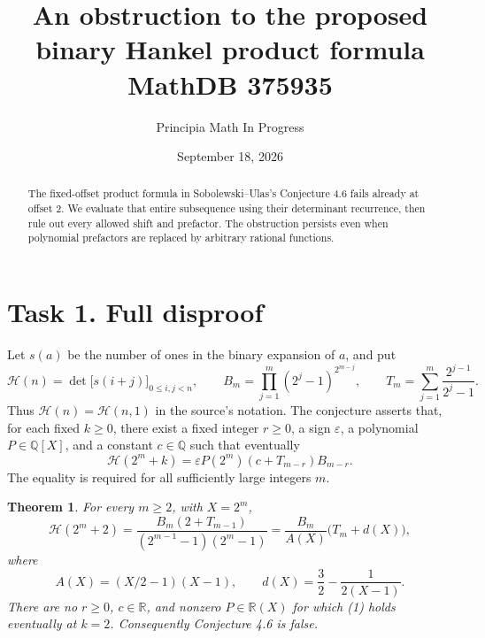\documentclass[11pt]{article}
\title{An obstruction to the proposed binary Hankel product formula\\\large MathDB 375935}
\author{Principia Math In Progress}
\date{September 18, 2026}
\newtheorem{theorem}{Theorem}
\newcommand{\HH}{\mathcal H}
\begin{document}
\maketitle
\begin{abstract}
The fixed-offset product formula in Sobolewski--Ulas's Conjecture 4.6
fails already at offset $2$. We evaluate that entire subsequence using
their determinant recurrence, then rule out every allowed shift and
prefactor. The obstruction persists even when polynomial prefactors
are replaced by arbitrary rational functions.
\end{abstract}

\section*{Task 1. Full disproof}
Let $s(a)$ be the number of ones in the binary expansion of $a$, and put
\[
 \HH(n)=\det\bigl[s(i+j)\bigr]_{0\le i,j<n},\qquad
 B_m=\prod_{j=1}^m(2^j-1)^{2^{m-j}},\qquad
 T_m=\sum_{j=1}^m\frac{2^{j-1}}{2^j-1}.
\]
Thus $\HH(n)=\HH(n,1)$ in the source's notation. The conjecture asserts
that, for each fixed $k\ge0$, there exist a fixed integer $r\ge0$, a sign
$\varepsilon$, a polynomial $P\in\mathbb Q[X]$, and a constant
$c\in\mathbb Q$ such that eventually
\[
 \HH(2^m+k)=\varepsilon P(2^m)(c+T_{m-r})B_{m-r}.                 \tag{1}
\]
The equality is required for all sufficiently large integers $m$.

\begin{theorem}
For every $m\ge2$, with $X=2^m$,
\[
 \boxed{\quad
 \HH(2^m+2)=\frac{B_m(2+T_{m-1})}{(2^{m-1}-1)(2^m-1)}
 =\frac{B_m}{A(X)}\bigl(T_m+d(X)\bigr),\quad}                  \tag{2}
\]
where
\[
 A(X)=(X/2-1)(X-1),\qquad d(X)=\frac32-\frac1{2(X-1)}.
\]
There are no $r\ge0$, $c\in\mathbb R$, and nonzero
$P\in\mathbb R(X)$ for which (1) holds eventually at $k=2$.
Consequently Conjecture 4.6 is false.
\end{theorem}
\end{document}
